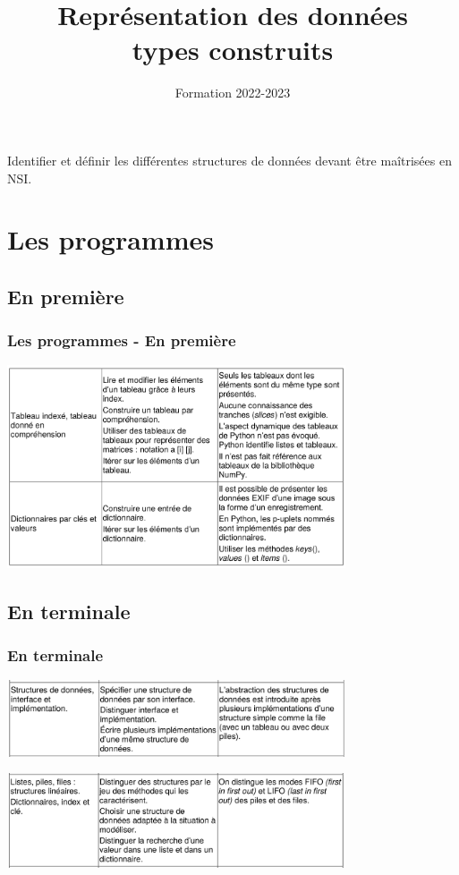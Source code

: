 \documentclass[svgnames,11pt]{beamer}
\author[]{Formation 2022-2023}
\title{Représentation des données \\ types construits}
\date{\framebox{\textbf{NSI}}}
\begin{document}
\begin{frame}
    \titlepage
\end{frame}
\begin{frame}
    \frametitle{}

    \begin{framed}
        \centering Identifier et définir les différentes structures de données devant être maîtrisées en NSI.
    \end{framed}

\end{frame}
\section{Les programmes}
\subsection{En première}
\begin{frame}
    \frametitle{Les programmes - En première}

    \begin{center}
        \includegraphics[width=10cm]{ressources/premiere.png}
    \end{center}

\end{frame}
\subsection{En terminale}
\begin{frame}
    \frametitle{En terminale}

    \begin{center}
        \includegraphics[width=10cm]{ressources/terminale1.png}
    \end{center}
    \begin{center}
        \includegraphics[width=10cm]{ressources/terminale2.png}
    \end{center}

\end{frame}
\end{document}
